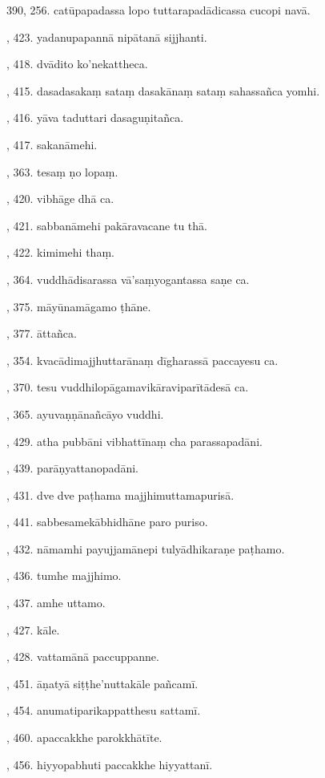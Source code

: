 390, 256. catūpapadassa lopo tuttarapadādicassa cucopi navā.\par {}, 423. yadanupapannā nipātanā sijjhanti.\par {}, 418. dvādito ko’nekattheca.\par {}, 415. dasadasakaṃ sataṃ dasakānaṃ sataṃ sahassañca yomhi.\par {}, 416. yāva taduttari dasaguṇitañca.\par {}, 417. sakanāmehi.\par {}, 363. tesaṃ ṇo lopaṃ.\par {}, 420. vibhāge dhā ca.\par {}, 421. sabbanāmehi pakāravacane tu thā.\par {}, 422. kimimehi thaṃ.\par {}, 364. vuddhādisarassa vā’saṃyogantassa saṇe ca.\par {}, 375. māyūnamāgamo ṭhāne.\par {}, 377. āttañca.\par {}, 354. kvacādimajjhuttarānaṃ dīgharassā paccayesu ca.\par {}, 370. tesu vuddhilopāgamavikāraviparītādesā ca.\par {}, 365. ayuvaṇṇānañcāyo vuddhi.\par {}, 429. atha pubbāni vibhattīnaṃ cha parassapadāni.\par {}, 439. parāṇyattanopadāni.\par {}, 431. dve dve paṭhama majjhimuttamapurisā.\par {}, 441. sabbesamekābhidhāne paro puriso.\par {}, 432. nāmamhi payujjamānepi tulyādhikaraṇe paṭhamo.\par {}, 436. tumhe majjhimo.\par {}, 437. amhe uttamo.\par {}, 427. kāle.\par {}, 428. vattamānā paccuppanne.\par {}, 451. āṇatyā siṭṭhe’nuttakāle pañcamī.\par {}, 454. anumatiparikappatthesu sattamī.\par {}, 460. apaccakkhe parokkhātīte.\par {}, 456. hiyyopabhuti paccakkhe hiyyattanī.\par \noindent
